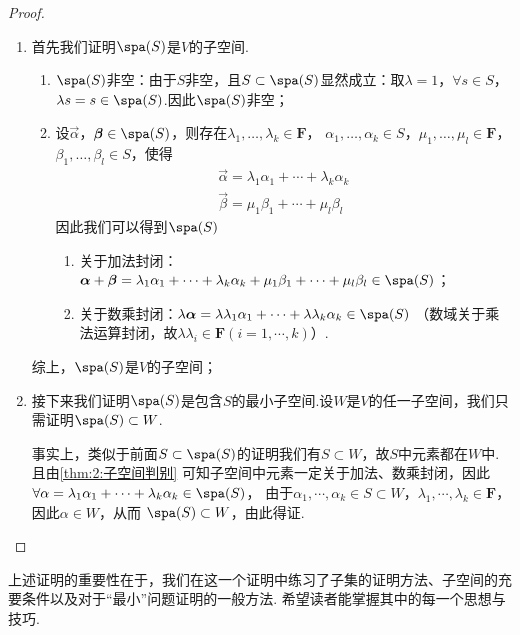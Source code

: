 \begin{proof}
    \begin{enumerate}
        \item 首先我们证明$\spa(S)$是$V$的子空间.
        \begin{enumerate}
            \item $\spa(S)$非空：由于$S$非空，且$S\subset\spa(S)$显然成立：取$\lambda=1$，$\forall s\in S$，
            $\lambda s=s\in\spa(S)$.因此$\spa(S)$非空；
            \item 设$\vec{\alpha}$，$\vec{\beta}\in\spa(S)$，则存在$\lambda_1,\ldots,\lambda_k\in\mathbf{F}$，
            $\alpha_1,\ldots,\alpha_k\in S$，$\mu_1,\ldots,\mu_l\in\mathbf{F}$，$\beta_1,\ldots,\beta_l\in S$，使得
            \begin{gather*}
                \vec{\alpha}=\lambda_1\alpha_1+\cdots+\lambda_k\alpha_k \\
                \vec{\beta}=\mu_1\beta_1+\cdots+\mu_l\beta_l
            \end{gather*}
            因此我们可以得到$\spa(S)$
            \begin{enumerate}
                \item 关于加法封闭：$\vec{\alpha}+\vec{\beta}=\lambda_1\alpha_1+\cdots+\lambda_k\alpha_k+\mu_1\beta_1+\cdots+\mu_l\beta_l\in\spa(S)$；
                \item 关于数乘封闭：$\lambda\vec{\alpha}=\lambda\lambda_1\alpha_1+\cdots+\lambda\lambda_k\alpha_k\in\spa(S)$
                （数域关于乘法运算封闭，故$\lambda\lambda_i\in\mathbf{F}(i=1,\cdots,k)$）.
            \end{enumerate}
        \end{enumerate}
        综上，$\spa(S)$是$V$的子空间；
        \item 接下来我们证明$\spa(S)$是包含$S$的最小子空间.设$W$是$V$的任一子空间，我们只需证明$\spa(S)\subset W$.
        
        事实上，类似于前面$S\subset\spa(S)$的证明我们有$S\subset W$，故$S$中元素都在$W$中.且由\autoref{thm:2:子空间判别}
        可知子空间中元素一定关于加法、数乘封闭，因此$\forall {\alpha}=\lambda_1\alpha_1+\cdots+\lambda_k\alpha_k\in\spa(S)$，
        由于$\alpha_1,\cdots,\alpha_k\in S\subset W$，$\lambda_1,\cdots,\lambda_k\in\mathbf{F}$，因此$\alpha\in W$，从而
        $\spa(S)\subset W$，由此得证.
    \end{enumerate}
\end{proof}

上述证明的重要性在于，我们在这一个证明中练习了子集的证明方法、子空间的充要条件以及对于``最小''问题证明的一般方法.
希望读者能掌握其中的每一个思想与技巧.

